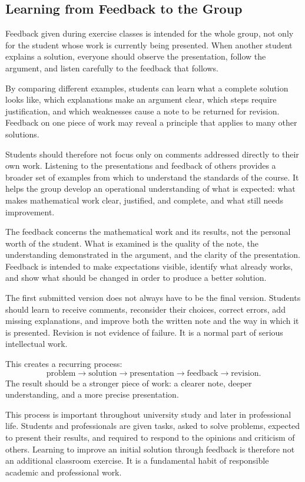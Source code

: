 \subsection{Learning from Feedback to the Group}

Feedback given during exercise classes is intended for the whole group, not
only for the student whose work is currently being presented. When another
student explains a solution, everyone should observe the presentation, follow
the argument, and listen carefully to the feedback that follows.

By comparing different examples, students can learn what a complete solution
looks like, which explanations make an argument clear, which steps require
justification, and which weaknesses cause a note to be returned for revision.
Feedback on one piece of work may reveal a principle that applies to many other
solutions.

Students should therefore not focus only on comments addressed directly to
their own work. Listening to the presentations and feedback of others provides
a broader set of examples from which to understand the standards of the course.
It helps the group develop an operational understanding of what is expected:
what makes mathematical work clear, justified, and complete, and what still
needs improvement.

The feedback concerns the mathematical work and its results, not the personal
worth of the student. What is examined is the quality of the note, the
understanding demonstrated in the argument, and the clarity of the
presentation. Feedback is intended to make expectations visible, identify what
already works, and show what should be changed in order to produce a better
solution.

The first submitted version does not always have to be the final version.
Students should learn to receive comments, reconsider their choices, correct
errors, add missing explanations, and improve both the written note and the way
in which it is presented. Revision is not evidence of failure. It is a normal
part of serious intellectual work.

This creates a recurring process:
\[
\text{problem}
\longrightarrow
\text{solution}
\longrightarrow
\text{presentation}
\longrightarrow
\text{feedback}
\longrightarrow
\text{revision}.
\]
The result should be a stronger piece of work: a clearer note, deeper
understanding, and a more precise presentation.

This process is important throughout university study and later in
professional life. Students and professionals are given tasks, asked to solve
problems, expected to present their results, and required to respond to the
opinions and criticism of others. Learning to improve an initial solution
through feedback is therefore not an additional classroom exercise. It is a
fundamental habit of responsible academic and professional work.

